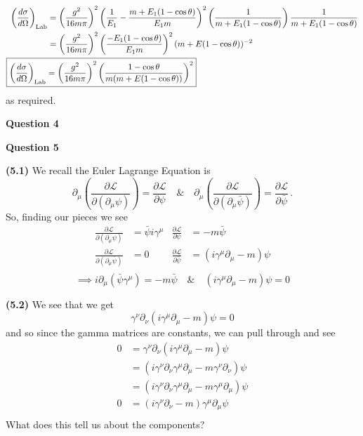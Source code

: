 \documentclass[10pt]{article}
\newcommand{\di}[2][]{\frac{\partial #1}{\partial #2}}
\newcommand{\del}[2][]{\frac{d #1}{d #2}}
\begin{document}
\begin{equation*}
  \begin{split}
    \left(\del[\sigma]{\Omega}\right)_{\text{Lab}} & = \left(\frac{g^{2}}{16m\pi}\right)^{2}\left(\frac{1}{E_{1}} - \frac{m + E_{1}(1-\cos\theta)}{E_{1}m}\right)^{2}\left(\frac{1}{m + E_{1}(1-\cos\theta)}\right)\frac{1}{m + E_{1}(1 - \cos\theta)} \\
    & = \left(\frac{g^{2}}{16m\pi}\right)^{2}\left(\frac{-E_{1}(1-\cos\theta)}{E_{1}m}\right)^{2}(m + E(1-\cos\theta))^{-2} \\
   \Aboxed{\left(\del[\sigma]{\Omega}\right)_{\text{Lab}} & = \left(\frac{g^{2}}{16m\pi}\right)^{2}\left(\frac{1 - \cos\theta}{m(m + E(1-\cos\theta))}\right)^{2}} \\
  \end{split}
\end{equation*}
as required.

\textbf{Question 4}

\textbf{Question 5}

\textbf{(5.1)} We recall the Euler Lagrange Equation is
\[ \partial_{\mu}\left(\frac{\partial \mathcal{L}}{\partial(\partial_{\mu}\psi)}\right) = \frac{\partial \mathcal{L}}{\partial \psi} \quad \& \quad \partial_{\mu}\left(\frac{\partial \mathcal{L}}{\partial(\partial_{\mu}\bar{\psi})}\right) = \frac{\partial \mathcal{L}}{\partial \bar{\psi}} \, .\]
So, finding our pieces we see
\begin{align*}
  \di[\mathcal{L}]{(\partial_{\mu}\psi)} & = \bar{\psi}i \gamma^{\mu}    &   \di[\mathcal{L}]{\psi} & = -m\bar{\psi} \\
  \di[\mathcal{L}]{(\partial_{\mu}\bar{\psi})} & = 0                     &   \di[\mathcal{L}]{\bar{\psi}} & = (i\gamma^{\mu}\partial_{\mu} - m)\psi \\
  \end{align*}
\[ \implies \boxed{i\partial_{\mu}\left(\bar{\psi}\gamma^{\mu}\right) = -m\bar{\psi}} \quad \& \quad \boxed{(i\gamma^{\mu}\partial_{\mu} - m)\psi = 0} \]

\textbf{(5.2)} We see that we get
\[ \gamma^{\nu}\partial_{\nu}(i\gamma^{\mu}\partial_{\mu} - m)\psi = 0 \]
and so since the gamma matrices are constants, we can pull through and see
\begin{equation*}
  \begin{split}
   0 & =\gamma^{\nu}\partial_{\nu}(i\gamma^{\mu}\partial_{\mu} - m)\psi \\
   & = (i\gamma^{\nu}\partial_{\nu}\gamma^{\mu}\partial_{\mu} - m\gamma^{\nu}\partial_{\nu})\psi \\
   & = (i\gamma^{\nu}\partial_{\nu}\gamma^{\mu}\partial_{\mu} - m\gamma^{\mu}\partial_{\mu})\psi \\
   0 & = (i\gamma^{\nu}\partial_{\nu} - m)\gamma^{\mu}\partial_{\mu}\psi \\
  \end{split}
\end{equation*}
What does this tell us about the components?
\end{document}
